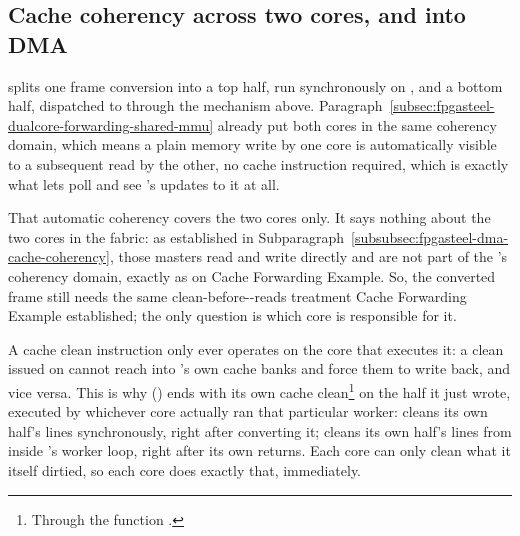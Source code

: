 \subsection{Cache coherency across two cores, and into DMA}
\label{subsec:fpgasteel-dualcore-forwarding-cache-coherency}

 splits one frame conversion into a top half, run synchronously on , and a bottom half, dispatched to  through the mechanism above. Paragraph~\ref{subsec:fpgasteel-dualcore-forwarding-shared-mmu} already put both cores in the same  coherency domain, which means a plain memory write by one core is automatically visible to a subsequent read by the other, no cache instruction required, which is exactly what lets  poll  and see 's updates to it at all.

That automatic coherency covers the two  cores only. It says nothing about the two  cores in the  fabric: as established in Subparagraph~\ref{subsubsec:fpgasteel-dma-cache-coherency}, those  masters read and write  directly and are not part of the 's coherency domain, exactly as on Cache Forwarding Example. So, the converted frame still needs the same clean-before--reads treatment Cache Forwarding Example established; the only question is which core is responsible for it.

A cache clean instruction only ever operates on the core that executes it: a clean issued on  cannot reach into 's own  cache banks and force them to write back, and vice versa. This is why  () ends with its own cache clean\footnote{Through the  function .} on the half it just wrote, executed by whichever core actually ran that particular worker:  cleans its own half's  lines synchronously, right after converting it;  cleans its own half's  lines from inside 's worker loop, right after its own  returns. Each core can only clean what it itself dirtied, so each core does exactly that, immediately.

